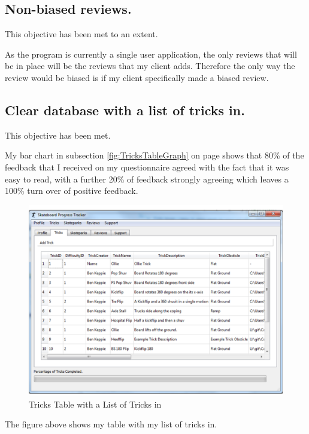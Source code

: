 \subsection{Non-biased reviews.}

This objective has been met to an extent. 

As the program is currently a single user application, the only reviews that will be in place will be the reviews that my client adds. Therefore the only way the review would be biased is if my client specifically made a biased review. 



\subsection{Clear database with a list of tricks in.} %

This objective has been met.

My bar chart in subsection \ref{fig:TricksTableGraph} on page \pageref{fig:TricksTableGraph} shows that 80\% of the feedback that I received on my questionnaire agreed with the fact that it was easy to read, with a further 20\% of feedback strongly agreeing which leaves a 100\% turn over of positive feedback.


\begin{figure}[H]
    \includegraphics[width=\textwidth]{./Evaluation/images/TricksTableNFS.pdf}
    \caption{Tricks Table with a List of Tricks in} \label{fig:TricksTableEX}
\end{figure}

The figure above shows my table with my list of tricks in.







